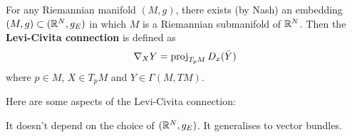 \begin{defn}[3.3]
  For any Riemannian manifold $(M,g)$, there exists (by Nash) an embedding $(M,g) \subset (\mathbb{R}^N,g_E)$ in which $M$ is a Riemannian submanifold of $\mathbb{R}^N$.
  Then the \textbf{Levi-Civita connection} is defined as
  \[ \nabla_XY = \operatorname{proj}_{T_pM} D_x(\bar Y) \]
  where $p \in M$, $X \in T_pM$ and $Y\in\Gamma(M,TM)$.
\end{defn}

Here are some aspects of the Levi-Civita connection:
\begin{itm}
  \io It doesn't depend on the choice of $(\mathbb{R}^N,g_E)$.
  \io It generalises to vector bundles.
\end{itm}

